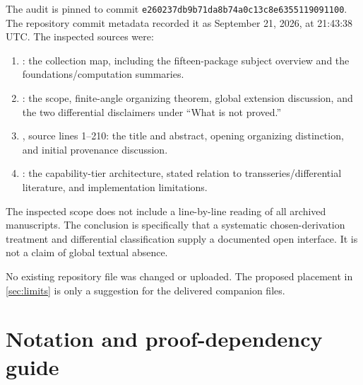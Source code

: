 \documentclass[11pt,letterpaper]{article}
\numberwithin{equation}{section}
\theoremstyle{definition}
\theoremstyle{remark}
\newcommand{\Commit}{\nolinkurl{e260237db9b71da8b74a0c13c8e6355119091100}}
\begin{document}
The audit is pinned to commit \Commit. The repository commit metadata recorded it as September 21, 2026, at 21:43:38 UTC. The inspected sources were:
\begin{enumerate}
\item {}: the collection map, including the fifteen-package subject overview and the foundations/computation summaries.
\item {}: the scope, finite-angle organizing theorem, global extension discussion, and the two differential disclaimers under ``What is not proved.''
\item {}, source lines 1--210: the title and abstract, opening organizing distinction, and initial provenance discussion.
\item {}: the capability-tier architecture, stated relation to transseries/differential literature, and implementation limitations.
\end{enumerate}
The inspected scope does not include a line-by-line reading of all archived manuscripts. The conclusion is specifically that a systematic chosen-derivation treatment and differential classification supply a documented open interface. It is not a claim of global textual absence.

No existing repository file was changed or uploaded. The proposed placement in \cref{sec:limits} is only a suggestion for the delivered companion files.

\section{Notation and proof-dependency guide}\label{app:notation}
\end{document}
